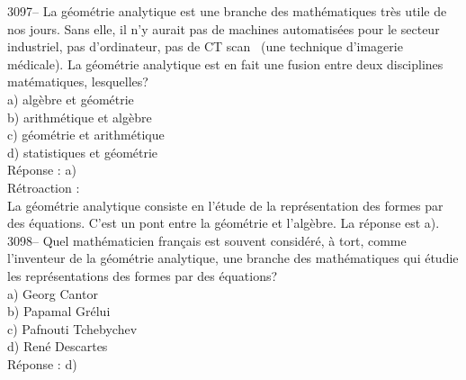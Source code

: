 \documentclass[letterpaper, 12pt]{article}
\begin{document}
3097-- La g\'eom\'etrie analytique est une branche des math\'ematiques tr\`es utile de nos jours. Sans elle, il n'y aurait pas de machines automatis\'ees pour le secteur industriel, pas d'ordinateur, pas de \og CT scan \fg \ (une technique d'imagerie m\'edicale). La g\'eom\'etrie analytique est en fait une fusion entre deux disciplines mat\'ematiques, lesquelles?\\

a) alg\`ebre et g\'eom\'etrie\\
b) arithm\'etique et alg\`ebre\\
c) g\'eom\'etrie et arithm\'etique\\
d) statistiques et g\'eom\'etrie\\

R\'eponse : a)\\

R\'etroaction :\\
La g\'eom\'etrie analytique consiste en l'\'etude de la repr\'esentation des formes par des \'equations. C'est un pont entre la g\'eom\'etrie et l'alg\`ebre. La r\'eponse est a).\\



3098-- Quel math\'ematicien fran\c cais est souvent consid\'er\'e, \`a tort, comme l'inventeur de la g\'eom\'etrie analytique, une branche des math\'ematiques qui \'etudie les repr\'esentations des formes par des \'equations?\\

a) Georg Cantor\\
b) Papamal Gr\'elui\\
c) Pafnouti Tchebychev\\
d) Ren\'e Descartes\\

R\'eponse : d)\\
\end{document}
